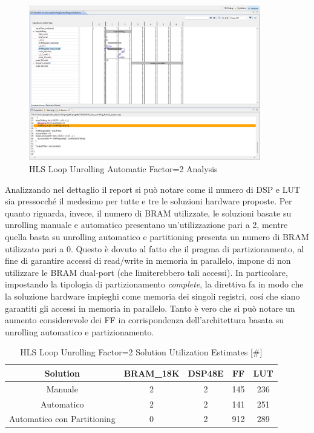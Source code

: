 \begin{figure}[H]
    \centering
    \includegraphics[width=0.9\textwidth]{solutions/loop_unrolling/factor2/loopunrollingautomatic2.png}
    \caption{HLS Loop Unrolling Automatic Factor=2 Analysis}
\end{figure}

Analizzando nel dettaglio il report si può notare come il numero di DSP e LUT sia pressocché il medesimo per tutte e tre le soluzioni hardware proposte. Per quanto riguarda, invece, il numero di BRAM utilizzate, le soluzioni basate su unrolling manuale e automatico presentano un'utilizzazione pari a 2, mentre quella basta su unrolling automatico e partitioning presenta un numero di BRAM utilizzato pari a 0. Questo è dovuto al fatto che il pragma di partizionamento, al fine di garantire accessi di read/write in memoria in parallelo, impone di non utilizzare le BRAM dual-port (che limiterebbero tali accessi). In particolare, impostando la tipologia di partizionamento \textit{complete}, la direttiva fa in modo che la soluzione hardware impieghi come memoria dei singoli registri, cosí che siano garantiti gli accessi in memoria in parallelo. Tanto è vero che si può notare un aumento considerevole dei FF in corrispondenza dell'architettura basata su unrolling automatico e partizionamento.

\begin{table}[H]
    \centering
    \begin{tabular}{|c|c|c|c|c|}
        \hline
        \textbf{Solution} & \textbf{BRAM\_18K} & \textbf{DSP48E} & \textbf{FF} & \textbf{LUT} \\
        \hline
        Manuale & 2 & 2 & 145 & 236 \\
        \hline
        Automatico & 2 & 2 & 141 & 251 \\
        \hline
        Automatico con Partitioning & 0 & 2 & 912 & 289 \\
        \hline
    \end{tabular}
    \caption{HLS Loop Unrolling Factor=2 Solution Utilization Estimates [\#]}
    \label{tab:vivado-loop-unrolling-factor2-solution-utilization-report}
\end{table}

